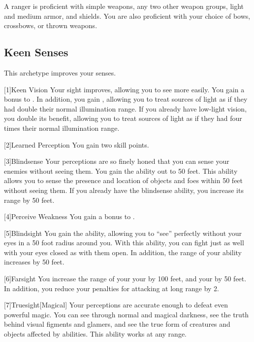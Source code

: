         A ranger is proficient with simple weapons, any two other weapon groups, light and medium armor, and shields.
        You are also proficient with your choice of bows, crossbows, or thrown weapons.

    \subsection{Keen Senses}
        This archetype improves your senses.

        [1]{Keen Vision}
        Your sight improves, allowing you to see more easily.
        You gain a  bonus to .
        In addition, you gain , allowing you to treat sources of light as if they had double their normal illumination range.
        If you already have low-light vision, you double its benefit, allowing you to treat sources of light as if they had four times their normal illumination range.

        [2]{Learned Perception} You gain two skill points.

        [3]{Blindsense}
        Your perceptions are so finely honed that you can sense your enemies without seeing them.
        You gain the  ability out to 50 feet.
        This ability allows you to sense the presence and location of objects and foes within 50 feet without seeing them.
        If you already have the blindsense ability, you increase its range by 50 feet.

        [4]{Perceive Weakness}
        You gain a  bonus to .

        [5]{Blindsight}
        You gain the  ability, allowing you to ``see'' perfectly without your eyes in a 50 foot radius around you.
        With this ability, you can fight just as well with your eyes closed as with them open.
        In addition, the range of your  ability increases by 50 feet.

        [6]{Farsight}
        You increase the range of your your  by 100 feet, and your  by 50 feet.
        In addition, you reduce your  penalties for attacking at long range by 2.

        [7]{Truesight}[Magical]
        Your perceptions are accurate enough to defeat even powerful magic.
        You can see through normal and magical darkness, see the truth behind visual figments and glamers, and see the true form of creatures and objects affected by  abilities.
        This ability works at any range.

